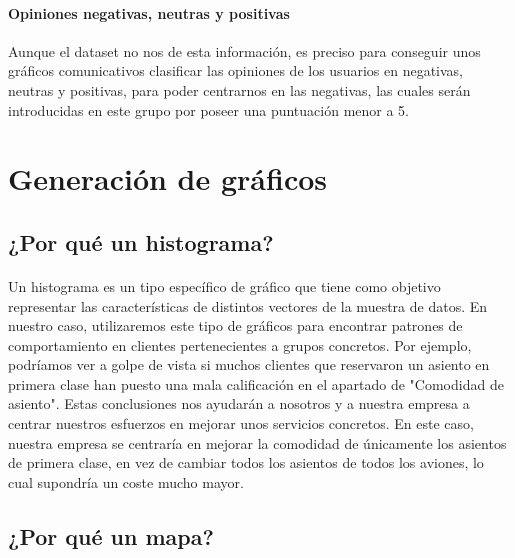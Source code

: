 \documentclass{report}
\begin{document}
            \paragraph*{Opiniones negativas, neutras y positivas}{Aunque el dataset no nos de esta información, es preciso para conseguir unos gráficos comunicativos clasificar las opiniones de los usuarios en negativas, neutras y positivas, para poder centrarnos en las negativas, las cuales serán introducidas en este grupo por poseer una puntuación menor a 5.} 

        \section{Generación de gráficos}
            \subsection{¿Por qué un histograma?}
                \paragraph*{}{Un histograma es un tipo específico de gráfico que tiene como objetivo representar las características de distintos vectores de la muestra de datos. En nuestro caso, utilizaremos este tipo de gráficos para encontrar patrones de comportamiento en clientes pertenecientes a grupos concretos. Por ejemplo, podríamos ver a golpe de vista si muchos clientes que reservaron un asiento en primera clase han puesto una mala calificación en el apartado de "Comodidad de asiento". Estas conclusiones nos ayudarán a nosotros y a nuestra empresa a centrar nuestros esfuerzos en mejorar unos servicios concretos. En este caso, nuestra empresa se centraría en mejorar la comodidad de únicamente los asientos de primera clase, en vez de cambiar todos los asientos de todos los aviones, lo cual supondría un coste mucho mayor.}
            \subsection{¿Por qué un mapa?}
\end{document}

